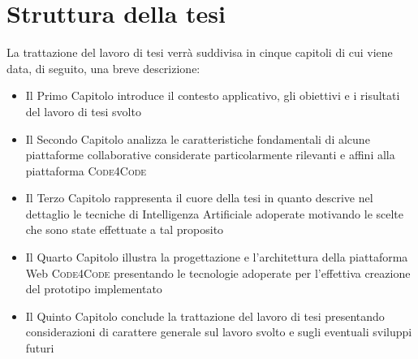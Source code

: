 \section{Struttura della tesi}
La trattazione del lavoro di tesi verrà suddivisa in cinque capitoli di cui viene data, di seguito, una breve descrizione:
\begin{itemize}
    \item Il Primo Capitolo introduce il contesto applicativo, gli obiettivi e i risultati del lavoro di tesi svolto
    \item Il Secondo Capitolo analizza le caratteristiche fondamentali di alcune piattaforme collaborative considerate particolarmente rilevanti e affini alla piattaforma \textsc{Code4Code}
    \item Il Terzo Capitolo rappresenta il cuore della tesi in quanto descrive nel dettaglio le tecniche di Intelligenza Artificiale adoperate motivando le scelte che sono state effettuate a tal proposito
    \item Il Quarto Capitolo illustra la progettazione e l'architettura della piattaforma Web \textsc{Code4Code} presentando le tecnologie adoperate per l'effettiva creazione del prototipo implementato
    \item Il Quinto Capitolo conclude la trattazione del lavoro di tesi presentando considerazioni di carattere generale sul lavoro svolto e sugli eventuali sviluppi futuri
\end{itemize}